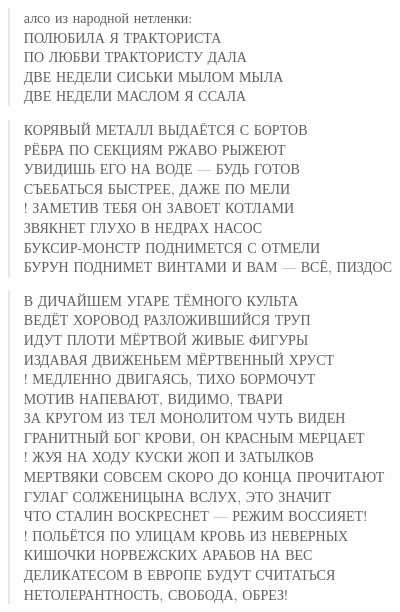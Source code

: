 \poemtitle{***}
\begin{verse}
алсо из народной нетленки:\\
ПОЛЮБИЛА Я ТРАКТОРИСТА\\
ПО ЛЮБВИ ТРАКТОРИСТУ ДАЛА\\
ДВЕ НЕДЕЛИ СИСЬКИ МЫЛОМ МЫЛА\\
ДВЕ НЕДЕЛИ МАСЛОМ Я ССАЛА
\end{verse}

\poemtitle{***}
\begin{verse}
КОРЯВЫЙ МЕТАЛЛ ВЫДАЁТСЯ С БОРТОВ\\
РЁБРА ПО СЕКЦИЯМ РЖАВО РЫЖЕЮТ\\
УВИДИШЬ ЕГО НА ВОДЕ — БУДЬ ГОТОВ\\
СЪЕБАТЬСЯ БЫСТРЕЕ, ДАЖЕ ПО МЕЛИ\\!
ЗАМЕТИВ ТЕБЯ ОН ЗАВОЕТ КОТЛАМИ\\
ЗВЯКНЕТ ГЛУХО В НЕДРАХ НАСОС\\
БУКСИР-МОНСТР ПОДНИМЕТСЯ С ОТМЕЛИ\\
БУРУН ПОДНИМЕТ ВИНТАМИ И ВАМ — ВСЁ, ПИЗДОС
\end{verse}

\poemtitle{***}
\begin{verse}
В ДИЧАЙШЕМ УГАРЕ ТЁМНОГО КУЛЬТА\\
ВЕДЁТ ХОРОВОД РАЗЛОЖИВШИЙСЯ ТРУП\\
ИДУТ ПЛОТИ МЁРТВОЙ ЖИВЫЕ ФИГУРЫ\\
ИЗДАВАЯ ДВИЖЕНЬЕМ МЁРТВЕННЫЙ ХРУСТ\\!
МЕДЛЕННО ДВИГАЯСЬ, ТИХО БОРМОЧУТ\\
МОТИВ НАПЕВАЮТ, ВИДИМО, ТВАРИ\\
ЗА КРУГОМ ИЗ ТЕЛ МОНОЛИТОМ ЧУТЬ ВИДЕН\\
ГРАНИТНЫЙ БОГ КРОВИ, ОН КРАСНЫМ МЕРЦАЕТ\\!
ЖУЯ НА ХОДУ КУСКИ ЖОП И ЗАТЫЛКОВ\\
МЕРТВЯКИ СОВСЕМ СКОРО ДО КОНЦА ПРОЧИТАЮТ\\
ГУЛАГ СОЛЖЕНИЦЫНА ВСЛУХ, ЭТО ЗНАЧИТ\\
ЧТО СТАЛИН ВОСКРЕСНЕТ — РЕЖИМ ВОССИЯЕТ!\\!
ПОЛЬЁТСЯ ПО УЛИЦАМ КРОВЬ ИЗ НЕВЕРНЫХ\\
КИШОЧКИ НОРВЕЖСКИХ АРАБОВ НА ВЕС\\
ДЕЛИКАТЕСОМ В ЕВРОПЕ БУДУТ СЧИТАТЬСЯ\\
НЕТОЛЕРАНТНОСТЬ, СВОБОДА, ОБРЕЗ!
\end{verse}

